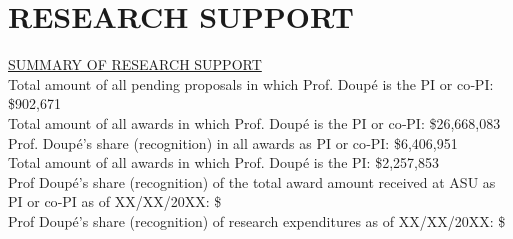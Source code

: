 \documentclass[11pt,letterpaper,sans]{moderncv}
\begin{document}


\section{RESEARCH SUPPORT}

\begin{framed}
  \underline{SUMMARY OF RESEARCH SUPPORT} \\
  Total amount of all pending proposals in which Prof. Doup\'e is the PI or co‐PI: \$902,671 \\
  Total amount of all awards in which Prof. Doup\'e is the PI or co‐PI: \$26,668,083  \\
  Prof. Doup\'e's share (recognition) in all awards as PI or co‐PI: \$6,406,951  \\
  Total amount of all awards in which Prof. Doup\'e is the PI: \$2,257,853  \\
  Prof Doup\'e's share (recognition) of the total award amount received at ASU as PI or co‐PI as of XX/XX/20XX: \$ \\
  Prof Doup\'e's share (recognition) of research expenditures as of XX/XX/20XX: \$ \\
\end{framed}
\end{document}
